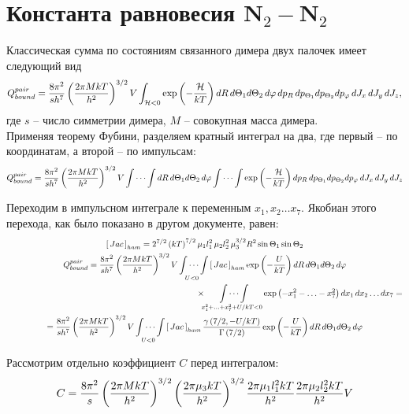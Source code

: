 \documentclass[12pt]{article}
\newcommand{\lb}{\left(}
\newcommand{\rb}{\right)}
\newcommand{\mH}{\mathcal{H}}
\begin{document}
\newpage

\section*{Константа равновесия N$_2-$N$_2$}

Классическая сумма по состояниям связанного димера двух палочек имеет следующий вид
\begin{gather}
		Q_{bound}^{pair} = \frac{8 \pi^2}{s h^7} \lb \frac{2 \pi M k T}{h^2} \rb^{3/2} V \int_{\mH < 0} \exp \lb - \frac{\mH}{kT} \rb dR \, d \Theta_1 d \Theta_2 \, d \varphi \, d p_R \, d p_{\Theta_1} d p_{\Theta_2} d p_\varphi \, d J_x \, d J_y \, d J_z, \notag 
\end{gather}
где $s$ -- число симметрии димера, $M$ -- совокупная масса димера. \\
Применяя теорему Фубини, разделяем кратный интеграл на два, где первый -- по координатам, а второй -- по импульсам: 
\begin{gather}
	Q_{bound}^{pair} = \frac{8 \pi^2}{s h^7} \lb \frac{2 \pi M k T}{h^2} \rb^{3/2} V \idotsint dR \, d \Theta_1 d \Theta_2 \, d \varphi \idotsint \exp \lb - \frac{\mH}{kT} \rb d p_R \, d p_{\Theta_1} d p_{\Theta_2} d p_\varphi \, d J_x \, d J_y \, d J_z \notag  
\end{gather}

Переходим в импульсном интеграле к переменным $x_1, x_2 \ldots x_7$. Якобиан этого перехода, как было показано в другом документе, равен:
\begin{gather}
		\left[ \, Jac \, \right]_{ham} = 2^{7/2} \lb k T \rb^{7/2} \mu_1 l_1^2 \, \mu_2 l_2^2 \, \mu_3^{3/2} R^2 \sin \Theta_1 \sin \Theta_2 \notag \\
	Q_{bound}^{pair} = \frac{8 \pi^2}{s h^7} \lb \frac{2 \pi M k T}{h^2} \rb^{3/2} V \idotsint\limits_{U < 0} \left[ \, Jac \, \right]_{ham} \exp \lb -\frac{U}{kT} \rb d R \, d \Theta_1 d \Theta_2 \, d \varphi \notag \\
	\hspace{8cm} \times \idotsint\limits_{x_1^2 + \ldots + x_7^2 + U/kT < 0} \exp \lb - x_1^2 - \ldots -x_7^2 \rb d x_1 \, d x_2 \ldots d x_7  = \notag \\
	= \frac{8 \pi^2}{s h^7} \lb \frac{2 \pi M k T}{h^2} \rb^{3/2} V \idotsint\limits_{U < 0} \left[ \, Jac \, \right]_{ham} \frac{\gamma \lb 7/2, - U/kT \rb}{\Gamma \lb 7/2 \rb} \exp \lb - \frac{U}{kT} \rb dR \, d \Theta_1 d \Theta_2 \, d \varphi \notag 
\end{gather}

Рассмотрим отдельно коэффициент $C$ перед интегралом:
\begin{gather}
		C = \frac{8 \pi^2}{s} \lb \frac{2 \pi M k T}{h^2} \rb^{3/2} \lb \frac{2 \pi \mu_3 k T}{h^2} \rb^{3/2} \frac{2 \pi \mu_1 l_1^2 k T}{h^2} \frac{2 \pi \mu_2 l_2^2 k T}{h^2} V \notag
\end{gather}
\end{document}
